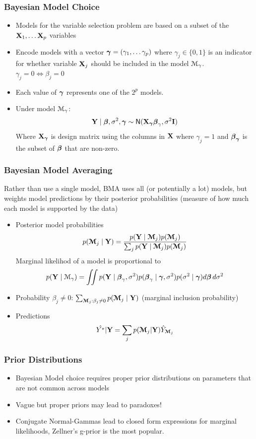 \documentclass[handout]{beamer}
\begin{document}
\begin{frame}\frametitle{Bayesian Model Choice}
  \begin{itemize}
  \item 
Models for the variable selection problem  are based on a subset of
  the $\mathbf{X}_1, \ldots \mathbf{X}_p$ variables  \pause 

\item Encode models with a  vector $\boldsymbol{\gamma} = (\gamma_1, \ldots
  \gamma_p)$  where  $\gamma_j \in \{0,1\}$  
  is an indicator for whether variable $\mathbf{X}_j$ should be included in
  the model ${\cal M}_\gamma$.  $\gamma_j = 0 \Leftrightarrow \beta_j
  = 0$  \pause 
\item Each value of $\boldsymbol{\gamma}$ represents one of the $2^p$ models.
\pause 
\item Under model ${\cal M}_\gamma$:
 $$\mathbf{Y} \mid \boldsymbol{\beta}, \sigma^2, \boldsymbol{\gamma} \sim \textsf{N}( \mathbf{X}_{\boldsymbol{\gamma}} \boldsymbol{\beta}_\gamma,
 \sigma^2 \mathbf{I}) $$
Where $\mathbf{X}_{\boldsymbol{\gamma}}$ is design matrix  using the columns in $\mathbf{X}$ where
 $\gamma_j = 1$ and $\boldsymbol{\beta}_{\boldsymbol{\gamma}}$ is the subset of $\boldsymbol{\beta}$ that are non-zero.

\end{itemize}

\end{frame}

\begin{frame}\frametitle{Bayesian Model Averaging}
  Rather than use a single model, BMA uses all (or potentially a lot) models,
  but weights model predictions by their posterior probabilities
  (measure of how much each model is supported by the data) \pause 
  \begin{itemize}
  \item Posterior model probabilities
$$p(\boldsymbol{{\cal M}}_j \mid \mathbf{Y}) = \frac{ p(\mathbf{Y} \mid \boldsymbol{{\cal M}}_j)p(\boldsymbol{{\cal M}}_j)}{\sum_jp(\mathbf{Y} \mid
  \boldsymbol{{\cal M}}_j)p(\boldsymbol{{\cal M}}_j)} $$ \pause 
Marginal likelihod of a model is proportional to 
$$ p(\mathbf{Y} \mid {\cal M}_\gamma) = \iint p(\mathbf{Y} \mid \boldsymbol{\beta}_\gamma,
  \sigma^2)p(\boldsymbol{\beta}_\gamma \mid \boldsymbol{\gamma}, \sigma^2)p(\sigma^2 \mid \boldsymbol{\gamma})
  d\boldsymbol{\beta}\, d\sigma^2$$\pause 
  \item Probability $\beta_j \ne 0$: $\sum_{\boldsymbol{{\cal M}}_j:  \beta_j \ne 0}
    p(\boldsymbol{{\cal M}}_j \mid \mathbf{Y})$ (marginal inclusion probability) \pause 
  \item Predictions $$\hat{Y^*}| \mathbf{Y}  = \sum_j p(\boldsymbol{{\cal M}}_j | \mathbf{Y}) \hat{Y}_{\boldsymbol{{\cal M}}_j} $$
  \end{itemize}
\end{frame}


\begin{frame}\frametitle{Prior Distributions}
  \begin{itemize}
  \item Bayesian Model choice requires  proper prior distributions on
    parameters that are not common across models  \pause 
  \item Vague but proper priors may lead to paradoxes! \pause 
  \item Conjugate Normal-Gammas lead to closed form expressions for
  marginal likelihoods, Zellner's g-prior is the most popular. \pause 
  \end{itemize}
\end{frame}
\end{document}
